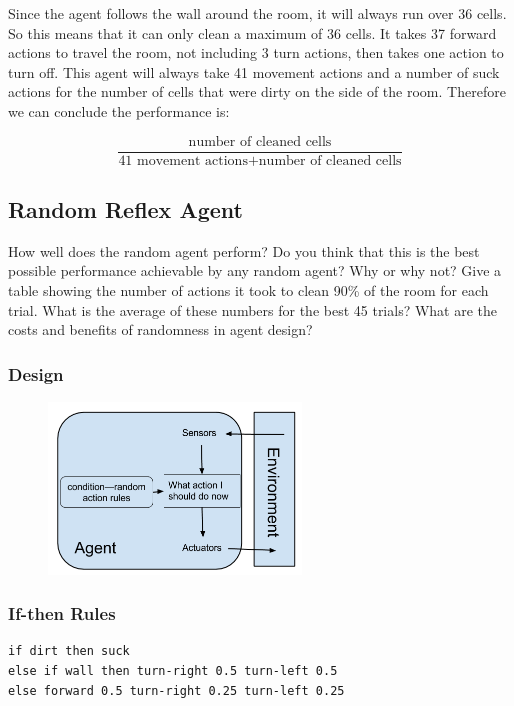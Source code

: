 \documentclass[a4paper,10pt]{article}
\begin{document}
Since the agent follows the wall around the room, it will always run over 36 cells.
So this means that it can only clean a maximum of 36 cells.
It takes 37 forward actions to travel the room, not including 3 turn actions, then takes one action to turn off.
This agent will always take 41 movement actions and a number of suck actions for the number of cells that were dirty on the side of the room.
Therefore we can conclude the performance is:

\[\frac{\mbox{number of cleaned cells}}{\mbox{41 movement actions} + \mbox{number of cleaned cells}}\]




\subsection{Random Reflex Agent}
How well does the random agent perform? Do you think that this is the best possible performance achievable by any random agent? Why or why not? Give a table showing the number of actions it took to clean 90\% of the room for each trial. What is the average of these numbers for the best 45 trials? What are the costs and benefits of randomness in agent design?
\subsubsection{Design}
\begin{figure}[H]
	\begin{center}
		\includegraphics[width=0.6\textwidth]{RandomReflex.png}
	\end{center}
\end{figure}
\subsubsection{If-then Rules}
\begin{verbatim}
if dirt then suck
else if wall then turn-right 0.5 turn-left 0.5
else forward 0.5 turn-right 0.25 turn-left 0.25
\end{verbatim}
\end{document}

